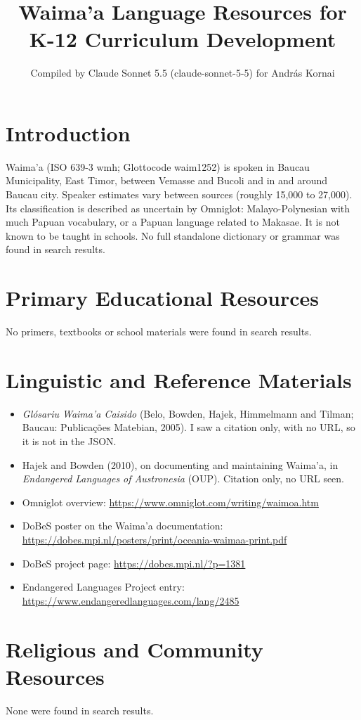 \documentclass[12pt]{article}
\title{Waima'a Language Resources for K-12 Curriculum Development}
\author{Compiled by Claude Sonnet 5.5 (claude-sonnet-5-5) for Andr\'as Kornai}
\date{}
\begin{document}
\maketitle

\section{Introduction}
Waima'a (ISO 639-3 wmh; Glottocode waim1252) is spoken in Baucau Municipality, East Timor, between Vemasse and Bucoli and in and around Baucau city. Speaker estimates vary between sources (roughly 15,000 to 27,000). Its classification is described as uncertain by Omniglot: Malayo-Polynesian with much Papuan vocabulary, or a Papuan language related to Makasae. It is not known to be taught in schools. No full standalone dictionary or grammar was found in search results.

\section{Primary Educational Resources}
No primers, textbooks or school materials were found in search results.

\section{Linguistic and Reference Materials}
\begin{itemize}
\item \emph{Gl\'osariu Waima'a Caisido} (Belo, Bowden, Hajek, Himmelmann and Tilman; Baucau: Publica\c{c}\~oes Matebian, 2005). I saw a citation only, with no URL, so it is not in the JSON.
\item Hajek and Bowden (2010), on documenting and maintaining Waima'a, in \emph{Endangered Languages of Austronesia} (OUP). Citation only, no URL seen.
\item Omniglot overview: \url{https://www.omniglot.com/writing/waimoa.htm}
\item DoBeS poster on the Waima'a documentation: \url{https://dobes.mpi.nl/posters/print/oceania-waimaa-print.pdf}
\item DoBeS project page: \url{https://dobes.mpi.nl/?p=1381}
\item Endangered Languages Project entry: \url{https://www.endangeredlanguages.com/lang/2485}
\end{itemize}

\section{Religious and Community Resources}
None were found in search results.
\end{document}

